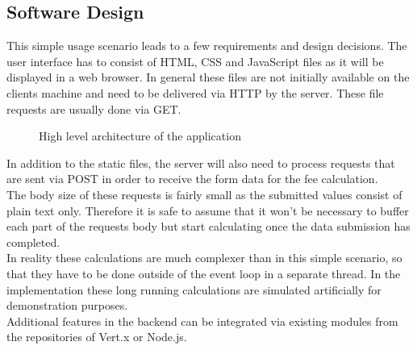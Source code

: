 




\FloatBarrier
\subsection{Software Design}
\label{software_design}


This simple usage scenario leads to a few requirements and
design decisions.
The user interface has to consist of HTML, CSS and JavaScript files as it 
will be displayed in a web browser. In general these files are not initially
available on the clients machine and need to be delivered via HTTP by the
server. These file requests are usually done via GET.\\

\begin{figure}[h]
	\centering
	\setlength\fboxsep{2pt}
	\caption{High level architecture of the application}
	\label{fig:high_level_architecture}
\end{figure}

In addition to the static files, the server will also need to process
requests that are sent via POST in order to receive the form data for the
fee calculation.\\
The body size of these requests is fairly small as the submitted values consist
of plain text only. Therefore it is safe to assume that it won't be necessary to
buffer each part of the requests body but start calculating once the data
submission has completed.\\
In reality these calculations are much complexer than in this simple scenario,
so that they have to be done outside of the event loop in a separate thread.
In the implementation these long running calculations are simulated artificially for
demonstration purposes.\\
Additional features in the backend can be integrated via existing modules from
the repositories of Vert.x or Node.js.



